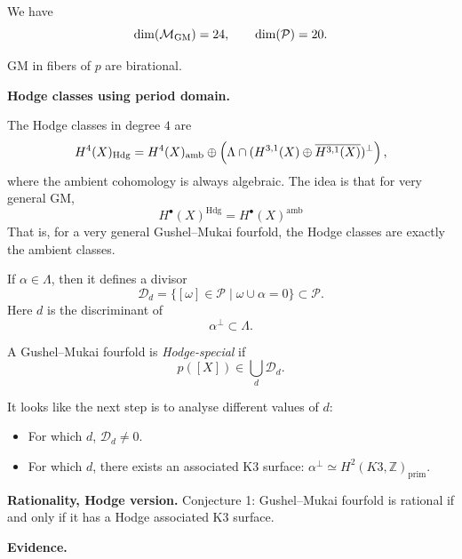\begin{remark}
\label{remark-have-m}
We have
\[
        \dim(\mathcal M_{\rm GM})=24,
        \qquad
        \dim(\mathcal P)=20.
\]
\end{remark}

\begin{remark}
\label{remark-debarre-kun2}
GM in fibers of $p$ are birational.
\end{remark}

\medskip\noindent
{\bf Hodge classes using period domain.}

The Hodge classes in degree $4$ are
\[
        H^4(X)_{\rm Hdg}
        =
        H^4(X)_{\rm amb}
        \oplus
        \left(
        \Lambda\cap
        (H^{3,1}(X)\oplus
        \overline{H^{3,1}(X)})^\perp
        \right),
\]
where the ambient cohomology is
always algebraic.
The idea is that for very general GM,
$$
H^\bullet(X)^{\text{Hdg}}
=H^\bullet(X)^{\text{amb} }
$$
That is, for a very general
Gushel--Mukai fourfold, the Hodge
classes are exactly the ambient
classes.

If $\alpha\in\Lambda$, then it
defines a divisor
\[
        \mathcal D_d
        =
        \{
        [\omega]\in\mathcal P
        \mid
        \omega\cup\alpha=0
        \}
        \subset \mathcal P.
\]
Here $d$ is the discriminant of
\[
        \alpha^\perp\subset\Lambda.
\]

\begin{definition}
\label{definition-gushel-mukai2}
A Gushel--Mukai fourfold is
{\it Hodge-special} if
\[
        p([X])\in
        \bigcup_d \mathcal D_d.
\]
\end{definition}

\noindent
It looks like the next step
is to analyse different values of $d$:

\begin{itemize}
\item For which $d$, $\mathcal{D}_d \neq  0$.
\item For which $d$, there exists
an associated K3 surface: $\alpha^\perp
\simeq H^2(K3, \mathbb{Z})_{\text{prim}}$.
\end{itemize}

\begin{remark}
\label{remark-rationality-hodge}
{\bf Rationality, Hodge version.}
Conjecture 1: 
Gushel--Mukai fourfold is rational
if and only if it has a Hodge
associated K3 surface.
\end{remark}

\medskip\noindent
{\bf Evidence.}

